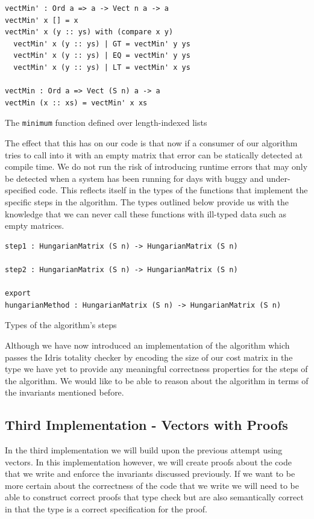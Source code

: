 \documentclass[a4paper, notitlepage]{report}
\begin{document}
\begin{listing}[H]
\begin{verbatim}
vectMin' : Ord a => a -> Vect n a -> a
vectMin' x [] = x
vectMin' x (y :: ys) with (compare x y)
  vectMin' x (y :: ys) | GT = vectMin' y ys
  vectMin' x (y :: ys) | EQ = vectMin' y ys
  vectMin' x (y :: ys) | LT = vectMin' x ys

vectMin : Ord a => Vect (S n) a -> a
vectMin (x :: xs) = vectMin' x xs
\end{verbatim}
\caption{The \texttt{minimum} function defined over length-indexed lists}
\end{listing}

The effect that this has on our code is that now if a consumer of our algorithm
tries to call into it with an empty matrix that error can be statically detected
at compile time. We do not run the risk of introducing runtime errors that may
only be detected when a system has been running for days with buggy and
under-specified code. This reflects itself in the types of the functions that
implement the specific steps in the algorithm. The types outlined below provide
us with the knowledge that we can never call these functions with ill-typed data
such as empty matrices.

\begin{listing}[H]
\begin{verbatim}
step1 : HungarianMatrix (S n) -> HungarianMatrix (S n)

step2 : HungarianMatrix (S n) -> HungarianMatrix (S n)

export
hungarianMethod : HungarianMatrix (S n) -> HungarianMatrix (S n)
\end{verbatim}
\caption{Types of the algorithm's steps}
\end{listing}

Although we have now introduced an implementation of the algorithm which passes
the Idris totality checker by encoding the size of our cost matrix in the type
we have yet to provide any meaningful correctness properties for the steps of
the algorithm. We would like to be able to reason about the algorithm in terms
of the invariants mentioned before.

\subsection{Third Implementation - Vectors with Proofs}
\label{sec:orgb54b20a}
In the third implementation we will build upon the previous attempt using
vectors. In this implementation however, we will create proofs about the code
that we write and enforce the invariants discussed previously. If we want to be
more certain about the correctness of the code that we write we will need to be
able to construct correct proofs that type check but are also semantically
correct in that the type is a correct specification for the proof.
\end{document}
